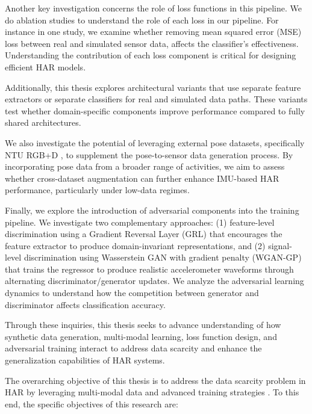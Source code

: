 Another key investigation concerns the role of loss functions in this pipeline. We do ablation studies to understand the role of each loss in our pipeline. For instance in one study, we examine whether removing mean squared error (MSE) loss between real and simulated sensor data, affects the classifier’s effectiveness. Understanding the contribution of each loss component is critical for designing efficient HAR models.

Additionally, this thesis explores architectural variants that use separate feature extractors or separate classifiers for real and simulated data paths. These variants test whether domain-specific components improve performance compared to fully shared architectures.

We also investigate the potential of leveraging external pose datasets, specifically NTU RGB+D \cite{shahroudy2016ntu}, to supplement the pose-to-sensor data generation process. By incorporating pose data from a broader range of activities, we aim to assess whether cross-dataset augmentation can further enhance IMU-based HAR performance, particularly under low-data regimes.

Finally, we explore the introduction of adversarial components into the training pipeline. We investigate two complementary approaches: (1) feature-level discrimination using a Gradient Reversal Layer (GRL) \cite{ganin2016domain} that encourages the feature extractor to produce domain-invariant representations, and (2) signal-level discrimination using Wasserstein GAN with gradient penalty (WGAN-GP) \cite{arjovsky2017wasserstein, gulrajani2017improved} that trains the regressor to produce realistic accelerometer waveforms through alternating discriminator/generator updates. We analyze the adversarial learning dynamics to understand how the competition between generator and discriminator affects classification accuracy. 

Through these inquiries, this thesis seeks to advance understanding of how synthetic data generation, multi-modal learning, loss function design, and adversarial training interact to address data scarcity and enhance the generalization capabilities of HAR systems.


The overarching objective of this thesis is to address the data scarcity problem in HAR by leveraging multi-modal data and advanced training strategies \cite{lara2012survey, hammerla2016deep}. To this end, the specific objectives of this research are:

